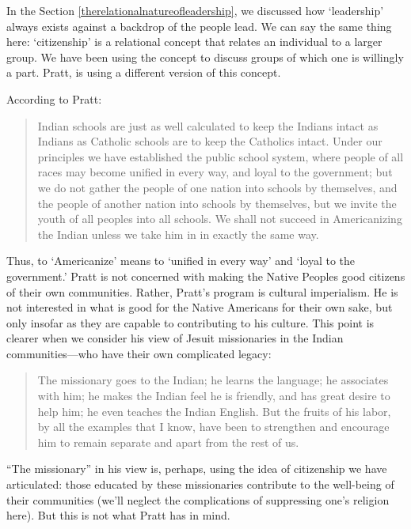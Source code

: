 In the Section \ref{therelationalnatureofleadership}, we discussed how `leadership' always exists against a backdrop of the people lead. We can say the same thing here: `citizenship' is a relational concept that relates an individual to a larger group. We have been using the concept to discuss groups of which one is willingly a part. Pratt, is using a different version of this concept. 

According to Pratt:

\begin{quote}

Indian schools are just as well calculated to keep the Indians intact as Indians as Catholic schools are to keep the Catholics intact. Under our principles we have established the public school system, where people of all races may become unified in every way, and loyal to the government; but we do not gather the people of one nation into schools by themselves, and the people of another nation into schools by themselves, but we invite the youth of all peoples into all schools. We shall not succeed in Americanizing the Indian unless we take him in in exactly the same way. 
\end{quote}

Thus, to `Americanize' means to `unified in every way' and `loyal to the government.' Pratt is not concerned with making the Native Peoples good citizens of their own communities. Rather, Pratt's program is cultural imperialism. He is not interested in what is good for the Native Americans for their own sake, but only insofar as they are capable to contributing to his culture. This point is clearer when we consider his view of Jesuit missionaries in the Indian communities---who have their own complicated legacy:

\begin{quote}

The missionary goes to the Indian; he learns the language; he associates with him; he makes the Indian feel he is friendly, and has great desire to help him; he even teaches the Indian English. But the fruits of his labor, by all the examples that I know, have been to strengthen and encourage him to remain separate and apart from the rest of us. 
\end{quote}

``The missionary'' in his view is, perhaps, using the idea of citizenship we have articulated: those educated by these missionaries contribute to the well-being of their communities (we'll neglect the complications of suppressing one's religion here). But this is not what Pratt has in mind.

